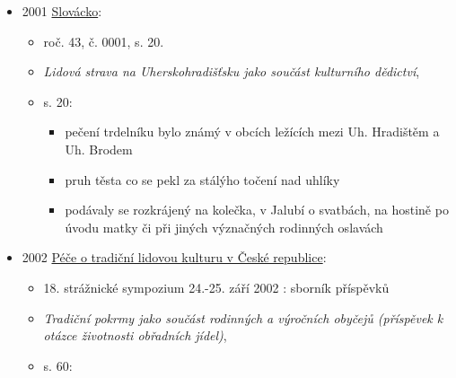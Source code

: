 \begin{itemize}
  \begin{itemize}
  \tightlist
  \item
  \item
    není online, 
  \item
    s. 152: Trdelníky (z jižní Moravy) 500 g polohrubé mouky, 2 lžíce
    cukru, 4
  \item
    s. 196: Trdelnica - (na Slovácku) zabíjačková polévka. Trdelník -
    pečivo navinuté při úpravě na trdlo. Trdlo - (staročesky) palička na
  \end{itemize}
\item
  2001
  \href{https://www.digitalniknihovna.cz/kfbz/uuid/uuid:a9321c14-1021-43dc-8103-3032373856fa}{Slovácko}:

  \begin{itemize}
  \tightlist
  \item
    roč. 43, č. 0001, s. 20.
  \item
    \emph{Lidová strava na Uherskohradišťsku jako součást kulturního
    dědictví}, 
  \item
    s. 20:

    \begin{itemize}
    \tightlist
    \item
      pečení trdelníku bylo známý v obcích ležících mezi Uh. Hradištěm a
      Uh. Brodem
    \item
      pruh těsta co se pekl za stálýho točení nad uhlíky
    \item
      podávaly se rozkrájený na kolečka, v Jalubí o svatbách, na hostině
      po úvodu matky či při jiných význačných rodinných oslavách
    \end{itemize}
  \end{itemize}
\item
  2002
  \href{https://www.digitalniknihovna.cz/nulk/uuid/uuid:f582cd95-65fe-4d23-b7a5-29f879aeeab3}{Péče
  o tradiční lidovou kulturu v České republice}:

  \begin{itemize}
  \tightlist
  \item
    18. strážnické sympozium 24.-25. září 2002 : sborník příspěvků
  \item
    \emph{Tradiční pokrmy jako součást rodinných a výročních obyčejů
    (příspěvek k otázce životnosti obřadních jídel)},
  \item
    s. 60:


\end{itemize}
\end{itemize}
